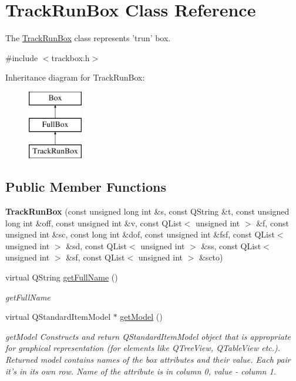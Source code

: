 \hypertarget{class_track_run_box}{\section{Track\-Run\-Box Class Reference}
\label{class_track_run_box}
}


The \hyperlink{class_track_run_box}{Track\-Run\-Box} class represents 'trun' box.  




{\ttfamily \#include $<$trackbox.\-h$>$}

Inheritance diagram for Track\-Run\-Box\-:\begin{figure}[H]
\begin{center}
\leavevmode
\includegraphics[height=3.000000cm]{class_track_run_box}
\end{center}
\end{figure}
\subsection*{Public Member Functions}
\begin{DoxyCompactItemize}
\item 
\hypertarget{class_track_run_box_aa21a17b58347a3ccb131657df451b763}{{\bfseries Track\-Run\-Box} (const unsigned long int \&s, const Q\-String \&t, const unsigned long int \&off, const unsigned int \&v, const Q\-List$<$ unsigned int $>$ \&f, const unsigned int \&sc, const long int \&dof, const unsigned int \&fsf, const Q\-List$<$ unsigned int $>$ \&sd, const Q\-List$<$ unsigned int $>$ \&ss, const Q\-List$<$ unsigned int $>$ \&sf, const Q\-List$<$ unsigned int $>$ \&scto)}\label{class_track_run_box_aa21a17b58347a3ccb131657df451b763}

\item 
virtual Q\-String \hyperlink{class_track_run_box_a26fb4feae53dac2aa48caaa39ccceb81}{get\-Full\-Name} ()
\begin{DoxyCompactList}\small\item\em get\-Full\-Name \end{DoxyCompactList}\item 
virtual Q\-Standard\-Item\-Model $\ast$ \hyperlink{class_track_run_box_ab2cc42d77e882ea0be127059ebda2c4d}{get\-Model} ()
\begin{DoxyCompactList}\small\item\em get\-Model Constructs and return Q\-Standard\-Item\-Model object that is appropriate for graphical representation (for elements like Q\-Tree\-View, Q\-Table\-View etc.). Returned model contains names of the box attributes and their value. Each pair it's in its own row. Name of the attribute is in column 0, value -\/ column 1. \end{DoxyCompactList}\end{DoxyCompactItemize}
